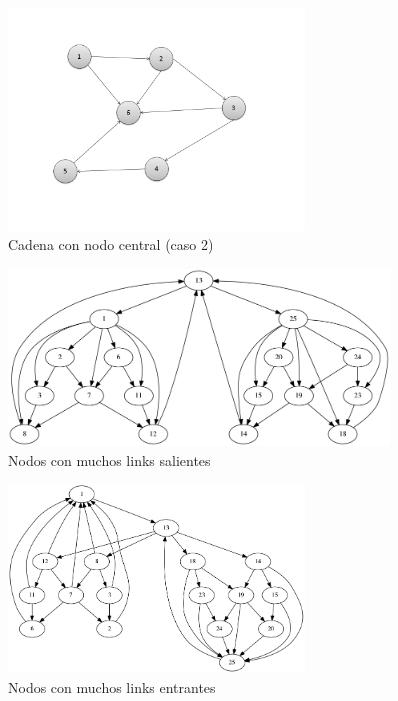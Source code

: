 \begin{figure}[h]
  \centering
    \includegraphics[width=0.7\textwidth]{img/Cadena6v2.png}
  \caption{Cadena con nodo central (caso 2)}
  \label{fig:Cadena con nodo central}
\end{figure}


\begin{figure}[h]
	\centering
	\includegraphics[width=0.9\textwidth]{img/links_salientes_25.png}
	\caption{Nodos con muchos links salientes}
	\label{fig:Nodos con muchos links salientes}
\end{figure}

\begin{figure}[h]
	\centering
	\includegraphics[width=0.7\textwidth]{img/links_entrantes_25.png}
	\caption{Nodos con muchos links entrantes}
	\label{fig:Nodos con muchos links entrantes}
\end{figure}
